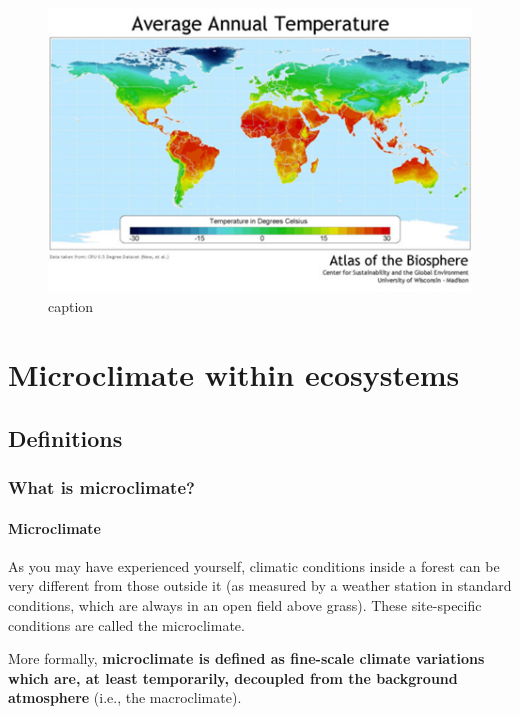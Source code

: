 \documentclass[12pt,oneside]{book}
\begin{document}
\begin{figure}

{\centering \includegraphics[width=0.8\linewidth]{figures/Figure812} 

}

\caption{caption}\label{fig:Vegetationzones7}
\end{figure}

\chapter{Microclimate within ecosystems}\label{Microclim}


\section{Definitions}\label{definitions-2}

\subsection{What is microclimate?}\label{what-is-microclimate}

\subsubsection{Microclimate}\label{microclimate}

As you may have experienced yourself, climatic conditions inside a
forest can be very different from those outside it (as measured by a
weather station in standard conditions, which are always in an open
field above grass). These site-specific conditions are called the
microclimate.

More formally, \textbf{microclimate is defined as fine-scale climate
variations which are, at least temporarily, decoupled from the
background atmosphere} (i.e., the macroclimate).
\end{document}
